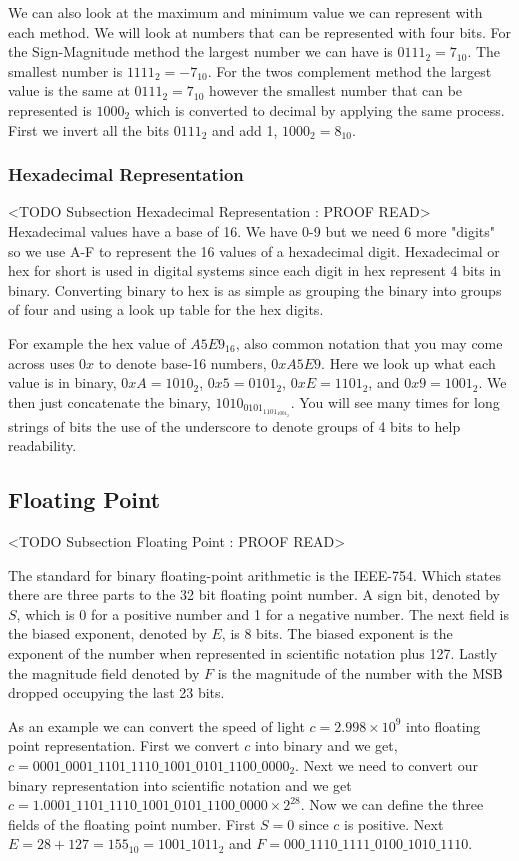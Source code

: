 We can also look at the maximum and minimum value we can represent with each method. We will look at numbers that can be represented with four bits. For the Sign-Magnitude method the largest number we can have is $0111_2 = 7_{10}$. The smallest number is $1111_2 = -7_{10}$. For the twos complement method the largest value is the same at $0111_2 = 7_{10}$ however the smallest number that can be represented is $1000_2$ which is converted to decimal by applying the same process. First we invert all the bits $0111_2$ and add 1, $1000_2 = 8_{10}$.
	
\subsubsection{Hexadecimal Representation}
	<TODO Subsection Hexadecimal Representation : PROOF READ>
Hexadecimal values have a base of 16. We have 0-9 but we need 6 more "digits" so we use A-F to represent the 16 values of a hexadecimal digit. Hexadecimal or hex for short is used in digital systems since each digit in hex represent 4 bits in binary. Converting binary to hex is as simple as grouping the binary into groups of four and using a look up table for the hex digits.
	
For example the hex value of $A5E9_{16}$, also common notation that you may come across uses $0x$ to denote base-16 numbers, $0xA5E9$. Here we look up what each value is in binary, $0xA=1010_2$, $0x5=0101_2$, $0xE=1101_2$, and $0x9=1001_2$. We then just concatenate the binary, $1010_0101_1101_1001_2$. You will see many times for long strings of bits the use of the underscore to denote groups of 4 bits to help readability.	
		
\subsection{Floating Point}
	<TODO Subsection Floating Point : PROOF READ>
	
The standard for binary floating-point arithmetic is the \ac{IEEE}-754. Which states there are three parts to the 32 bit floating point number. A sign bit, denoted by $S$, which is 0 for a positive number and 1 for a negative number. The next field is the biased exponent, denoted by $E$, is 8 bits. The biased exponent is the exponent of the number when represented in scientific notation plus 127. Lastly the magnitude field denoted by $F$ is the magnitude of the number with the \ac{MSB} dropped occupying the last 23 bits.

As an example we can convert the speed of light $c = 2.998 \times 10^9$ into floating point representation. First we convert $c$ into binary and we get, $c=0001\_0001\_1101\_1110\_1001\_0101\_1100\_0000_2$. Next we need to convert our binary representation into scientific notation and we get $c=1.0001\_1101\_1110\_1001\_0101\_1100\_0000 \times 2^{28}$. Now we can define the three fields of the floating point number. First $S=0$ since $c$ is positive. Next $E=28+127=155_{10}=1001\_1011_2$ and $F=000\_1110\_1111\_0100\_1010\_1110$.


